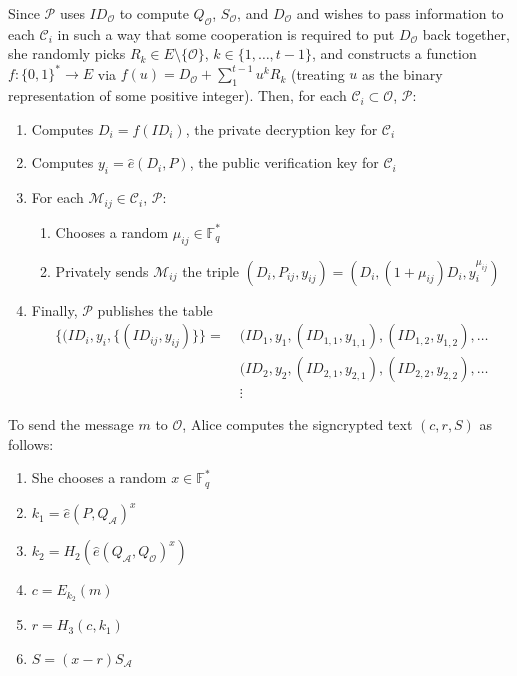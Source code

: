 Since $\mathcal{P}$ uses $ID_{\mathcal{O}}$ to compute $Q_{\mathcal{O}}$,
    $S_{\mathcal{O}}$, and $D_{\mathcal{O}}$ and wishes to pass information to
    each $\mathcal{C}_i$ in such a way that some cooperation is required to put
    $D_{\mathcal{O}}$ back together, she randomly picks $R_k \in E \setminus\{
    \mathcal{O}\}$, $k \in \{1, \ldots, t - 1\}$, and constructs a function $f:
    \{0, 1\}^\ast \to E$ via $f(u) = D_{\mathcal{O}} + \sum_1^{t-1} u^k R_k$
    (treating $u$ as the binary representation of some positive integer).
Then, for each $\mathcal{C}_i \subset \mathcal{O}$, $\mathcal{P}$:
\begin{enumerate}
\item Computes $D_i = f(ID_i)$, the private decryption key for $\mathcal{C}_i$
\item Computes $y_i = \widehat{e}(D_i, P)$, the public verification key for
    $\mathcal{C}_i$
\item For each $\mathcal{M}_{ij} \in \mathcal{C}_i$, $\mathcal{P}$:
    \begin{enumerate}
    \item Chooses a random $\mu_{ij} \in \mathbb{F}_q^\ast$
    \item Privately sends $\mathcal{M}_{ij}$ the triple
    \begin{math}
    (D_i, P_{ij}, y_{ij}) = \left(D_i, (1 + \mu_{ij})D_i, y_i^{\mu_{ij}}\right)
    \end{math}
    \end{enumerate}
\item Finally, $\mathcal{P}$ publishes the table
\begin{align*}
\{(ID_i, y_i, \{(ID_{ij}, y_{ij})\}\}
    =\; &(ID_1, y_1, (ID_{1, 1}, y_{1, 1}), (ID_{1, 2}, y_{1, 2}), \ldots\\
        &(ID_2, y_2,  (ID_{2, 1}, y_{2, 1}), (ID_{2, 2}, y_{2, 2}), \ldots\\
        &\vdots
\end{align*}
\end{enumerate}



To send the message $m$ to $\mathcal{O}$, Alice computes the signcrypted text
    $(c, r, S)$ as follows:
\begin{enumerate}
\item She chooses a random $x \in \mathbb{F}_q^\ast$
\item $k_1 = \widehat{e}(P, Q_\mathcal{A})^x$
\item $k_2 = H_2(\widehat{e}(Q_\mathcal{A}, Q_{\mathcal{O}})^x)$
\item $c = E_{k_2}(m)$
\item $r = H_3(c, k_1)$
\item $S = (x - r)S_\mathcal{A}$
\end{enumerate}


